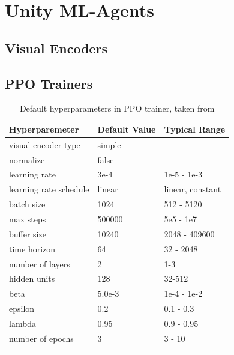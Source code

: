 
\section{Unity ML-Agents}\label{appendix:mlagents}

\subsection{Visual Encoders}\label{appendix:visual-encoders}


\subsection{PPO Trainers}\label{appendix:ppo-trainer}

\begin{longtable}{@{} p{3.5cm} p{2.5cm} p{2.5cm} @{}} \toprule
\textbf{Hyperparemeter}       & \textbf{Default Value} & \textbf{Typical Range} \\ \midrule
visual encoder type         & simple    & - \\ 
normalize                   & false     & - \\
learning rate               & 3e-4      & 1e-5 - 1e-3 \\ 
learning rate schedule      & linear    & linear, constant \\ 
batch size                  &  1024     & 512 - 5120 \\
max steps                   &  500000   & 5e5 - 1e7 \\ 
buffer size                 & 10240     & 2048 - 409600 \\ 
time horizon                &  64       & 32 - 2048  \\
number of layers            &  2        & 1-3 \\
hidden units                &  128      & 32-512 \\
beta                        &  5.0e-3   & 1e-4 - 1e-2  \\
epsilon                     &  0.2      & 0.1 - 0.3  \\
lambda                      &  0.95     & 0.9 - 0.95  \\
number of epochs            & 3         & 3 - 10 \\ \bottomrule
\caption{Default hyperparameters in PPO trainer, taken from \cite{unitymlagentsgithub}} \label{tab:default-hyperparameters}
\end{longtable}


